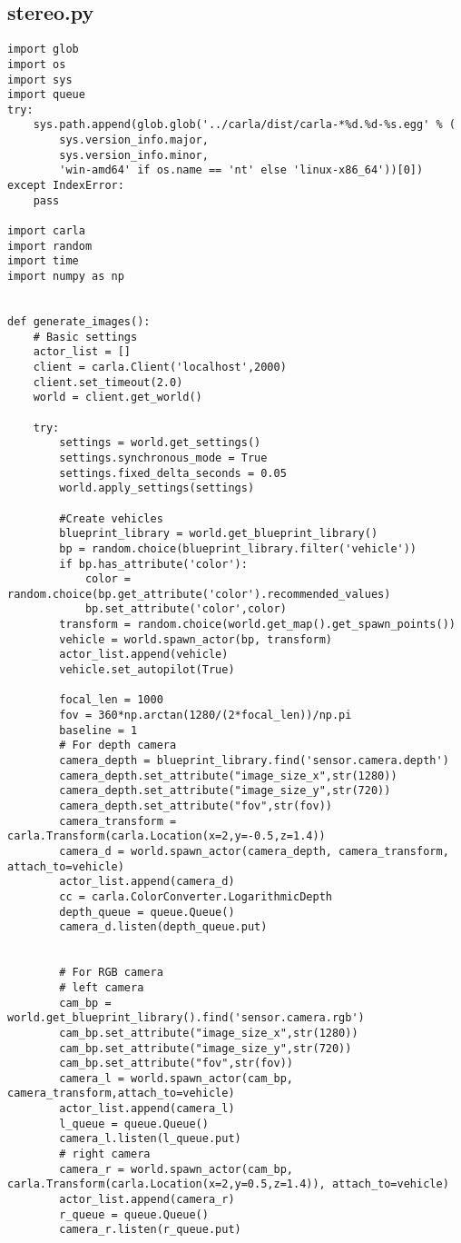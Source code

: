 \subsection*{stereo.py}
\begin{verbatim}
import glob
import os
import sys
import queue
try:
    sys.path.append(glob.glob('../carla/dist/carla-*%d.%d-%s.egg' % (
        sys.version_info.major,
        sys.version_info.minor,
        'win-amd64' if os.name == 'nt' else 'linux-x86_64'))[0])
except IndexError:
    pass

import carla
import random
import time
import numpy as np


def generate_images():
    # Basic settings
    actor_list = []
    client = carla.Client('localhost',2000)
    client.set_timeout(2.0)
    world = client.get_world()

    try:
        settings = world.get_settings()
        settings.synchronous_mode = True
        settings.fixed_delta_seconds = 0.05
        world.apply_settings(settings)

        #Create vehicles
        blueprint_library = world.get_blueprint_library()
        bp = random.choice(blueprint_library.filter('vehicle'))
        if bp.has_attribute('color'):
            color = random.choice(bp.get_attribute('color').recommended_values)
            bp.set_attribute('color',color)
        transform = random.choice(world.get_map().get_spawn_points())
        vehicle = world.spawn_actor(bp, transform)
        actor_list.append(vehicle)
        vehicle.set_autopilot(True)

        focal_len = 1000
        fov = 360*np.arctan(1280/(2*focal_len))/np.pi
        baseline = 1
        # For depth camera
        camera_depth = blueprint_library.find('sensor.camera.depth')
        camera_depth.set_attribute("image_size_x",str(1280))
        camera_depth.set_attribute("image_size_y",str(720))
        camera_depth.set_attribute("fov",str(fov))
        camera_transform = carla.Transform(carla.Location(x=2,y=-0.5,z=1.4))
        camera_d = world.spawn_actor(camera_depth, camera_transform, attach_to=vehicle)
        actor_list.append(camera_d)
        cc = carla.ColorConverter.LogarithmicDepth
        depth_queue = queue.Queue()
        camera_d.listen(depth_queue.put)


        # For RGB camera
        # left camera
        cam_bp = world.get_blueprint_library().find('sensor.camera.rgb')
        cam_bp.set_attribute("image_size_x",str(1280))
        cam_bp.set_attribute("image_size_y",str(720))
        cam_bp.set_attribute("fov",str(fov))
        camera_l = world.spawn_actor(cam_bp, camera_transform,attach_to=vehicle)
        actor_list.append(camera_l)
        l_queue = queue.Queue()
        camera_l.listen(l_queue.put)  
        # right camera
        camera_r = world.spawn_actor(cam_bp, carla.Transform(carla.Location(x=2,y=0.5,z=1.4)), attach_to=vehicle)
        actor_list.append(camera_r)
        r_queue = queue.Queue()
        camera_r.listen(r_queue.put)


\end{verbatim}
